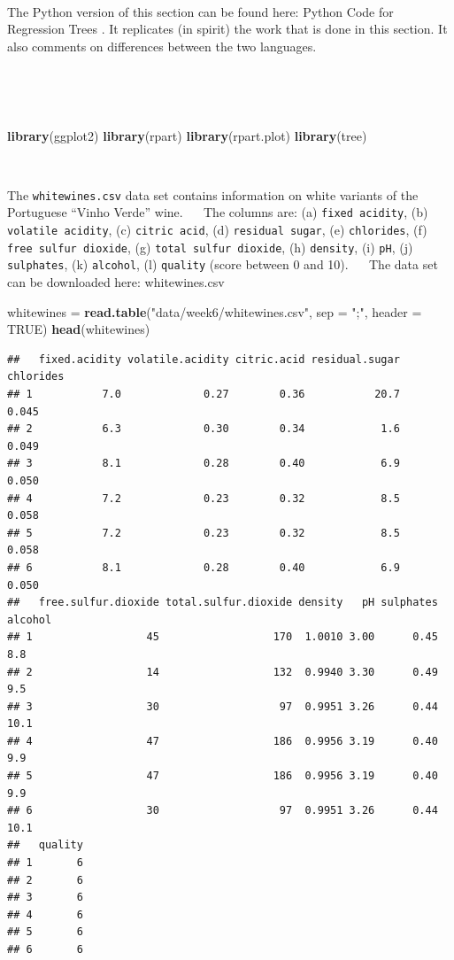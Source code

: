 \documentclass[
]{book}
\newenvironment{Shaded}{\begin{snugshade}}{\end{snugshade}}
\newcommand{\AttributeTok}[1]{\textcolor[rgb]{0.13,0.29,0.53}{#1}}
\newcommand{\ConstantTok}[1]{\textcolor[rgb]{0.56,0.35,0.01}{#1}}
\newcommand{\FunctionTok}[1]{\textcolor[rgb]{0.13,0.29,0.53}{\textbf{#1}}}
\newcommand{\NormalTok}[1]{#1}
\newcommand{\OtherTok}[1]{\textcolor[rgb]{0.56,0.35,0.01}{#1}}
\newcommand{\StringTok}[1]{\textcolor[rgb]{0.31,0.60,0.02}{#1}}
\begin{document}
~
~

The Python version of this section can be found here: Python Code for Regression Trees . It replicates (in spirit) the work that is done in this section. It also comments on differences between the two languages.

~

~~

\begin{Shaded}
\begin{Highlighting}[]
\FunctionTok{library}\NormalTok{(ggplot2)}
\FunctionTok{library}\NormalTok{(rpart)}
\FunctionTok{library}\NormalTok{(rpart.plot)}
\FunctionTok{library}\NormalTok{(tree)}
\end{Highlighting}
\end{Shaded}

~~

The \texttt{whitewines.csv} data set contains information on white variants of the Portuguese ``Vinho Verde'' wine.
~~
The columns are:
(a) \texttt{fixed\ acidity},
(b) \texttt{volatile\ acidity},
(c) \texttt{citric\ acid},
(d) \texttt{residual\ sugar},
(e) \texttt{chlorides},
(f) \texttt{free\ sulfur\ dioxide},
(g) \texttt{total\ sulfur\ dioxide},
(h) \texttt{density},
(i) \texttt{pH},
(j) \texttt{sulphates},
(k) \texttt{alcohol},
(l) \texttt{quality} (score between 0 and 10).
~~
The data set can be downloaded here: whitewines.csv
~~

\begin{Shaded}
\begin{Highlighting}[]
\NormalTok{whitewines }\OtherTok{=} \FunctionTok{read.table}\NormalTok{(}\StringTok{"data/week6/whitewines.csv"}\NormalTok{, }\AttributeTok{sep =} \StringTok{";"}\NormalTok{,}
    \AttributeTok{header =} \ConstantTok{TRUE}\NormalTok{)}
\FunctionTok{head}\NormalTok{(whitewines)}
\end{Highlighting}
\end{Shaded}

\begin{verbatim}
##   fixed.acidity volatile.acidity citric.acid residual.sugar chlorides
## 1           7.0             0.27        0.36           20.7     0.045
## 2           6.3             0.30        0.34            1.6     0.049
## 3           8.1             0.28        0.40            6.9     0.050
## 4           7.2             0.23        0.32            8.5     0.058
## 5           7.2             0.23        0.32            8.5     0.058
## 6           8.1             0.28        0.40            6.9     0.050
##   free.sulfur.dioxide total.sulfur.dioxide density   pH sulphates alcohol
## 1                  45                  170  1.0010 3.00      0.45     8.8
## 2                  14                  132  0.9940 3.30      0.49     9.5
## 3                  30                   97  0.9951 3.26      0.44    10.1
## 4                  47                  186  0.9956 3.19      0.40     9.9
## 5                  47                  186  0.9956 3.19      0.40     9.9
## 6                  30                   97  0.9951 3.26      0.44    10.1
##   quality
## 1       6
## 2       6
## 3       6
## 4       6
## 5       6
## 6       6
\end{verbatim}
\end{document}

